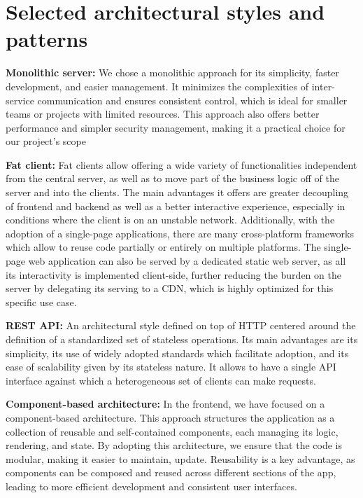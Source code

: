 \begin{itemize}
\newpage

\end{itemize}


\section{Selected architectural styles and patterns}
\textbf{Monolithic server:}
We chose a monolithic approach for its simplicity, faster development, and easier management. It minimizes the complexities of inter-service communication and ensures consistent control, which is ideal for smaller teams or projects with limited resources. This approach also offers better performance and simpler security management, making it a practical choice for our project’s scope

\textbf{Fat client:}
Fat clients allow offering a wide variety of functionalities independent from the central server, as well as to move part of the business logic off of the server and into the clients. The main advantages it offers are greater decoupling of frontend and backend as well as a better interactive experience, especially in conditions where the client is on an unstable network. Additionally, with the adoption of a single-page applications, there are many cross-platform frameworks which allow to reuse code partially or entirely on multiple platforms. The single-page web application can also be served by a dedicated static web server, as all its interactivity is implemented client-side, further reducing the burden on the server by delegating its serving to a CDN, which is highly optimized for
this specific use case.

\textbf{REST API:}
An architectural style defined on top of HTTP centered around the definition of a standardized set of stateless operations. Its main advantages are its simplicity, its use of widely adopted standards which facilitate adoption, and its ease of scalability given by its stateless nature. It allows to have a single API interface against which a heterogeneous set of clients can make requests.

\textbf{Component-based architecture:}
In the frontend, we have focused on a component-based architecture. This approach structures the application as a collection of reusable and self-contained components, each managing its logic, rendering, and state. By adopting this architecture, we ensure that the code is modular, making it easier to maintain, update. Reusability is a key advantage, as components can be composed and reused across different sections of the app, leading to more efficient development and consistent user interfaces.



